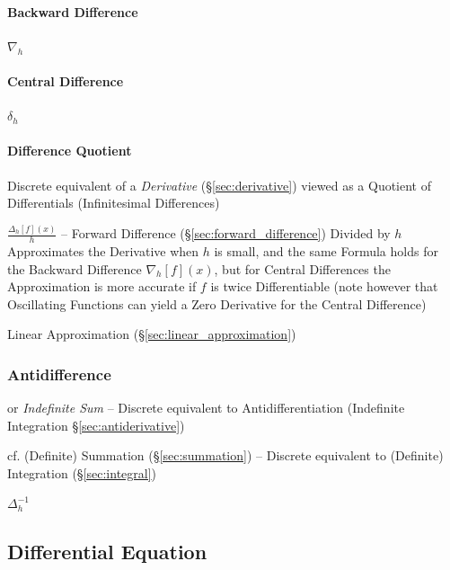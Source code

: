 {\paragraph{Backward Difference}\label{sec:backward_difference}\hfill

$\nabla_h$



\paragraph{Central Difference}\label{sec:central_difference}\hfill

$\delta_h$



\paragraph{Difference Quotient}\label{sec:difference_quotient}\hfill

\fist Discrete equivalent of a \emph{Derivative} (\S\ref{sec:derivative}) viewed
as a Quotient of Differentials (Infinitesimal Differences)

$\frac{\Delta_h[f](x)}{h}$ -- Forward Difference
(\S\ref{sec:forward_difference}) Divided by $h$ Approximates the Derivative when
$h$ is small, and the same Formula holds for the Backward Difference
$\nabla_h[f](x)$, but for Central Differences the Approximation is more accurate
if $f$ is twice Differentiable (note however that Oscillating Functions can
yield a Zero Derivative for the Central Difference)

Linear Approximation (\S\ref{sec:linear_approximation})



\subsubsection{Antidifference}\label{sec:antidifference}

or \emph{Indefinite Sum} -- Discrete equivalent to Antidifferentiation
(Indefinite Integration \S\ref{sec:antiderivative})

cf. (Definite) Summation (\S\ref{sec:summation}) -- Discrete equivalent to
(Definite) Integration (\S\ref{sec:integral})

$\Delta^{-1}_h$



\subsection{Differential Equation}\label{sec:differential_equation}

}
